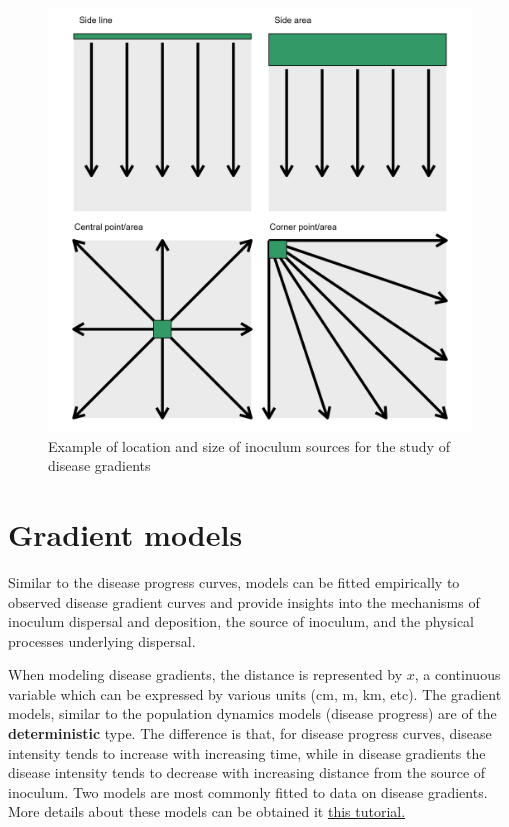 \documentclass[
  letterpaper,
]{book}
\begin{document}
\begin{figure}

\includegraphics[width=6.08333in,height=\textheight]{imgs/gradients.png} \hfill{}

\caption{\label{fig-gradient}Example of location and size of inoculum
sources for the study of disease gradients}

\end{figure}

\hypertarget{gradient-models}{%
\chapter{Gradient models}\label{gradient-models}}

Similar to the disease progress curves, models can be fitted empirically
to observed disease gradient curves and provide insights into the
mechanisms of inoculum dispersal and deposition, the source of inoculum,
and the physical processes underlying dispersal.

When modeling disease gradients, the distance is represented by \(x\), a
continuous variable which can be expressed by various units (cm, m, km,
etc). The gradient models, similar to the population dynamics models
(disease progress) are of the \textbf{deterministic} type. The
difference is that, for disease progress curves, disease intensity tends
to increase with increasing time, while in disease gradients the disease
intensity tends to decrease with increasing distance from the source of
inoculum. Two models are most commonly fitted to data on disease
gradients. More details about these models can be obtained it
\href{https://www.apsnet.org/edcenter/disimpactmngmnt/topc/EcologyAndEpidemiologyInR/ModelingDispersalGradients/Pages/default.aspx}{this
tutorial.}
\end{document}
